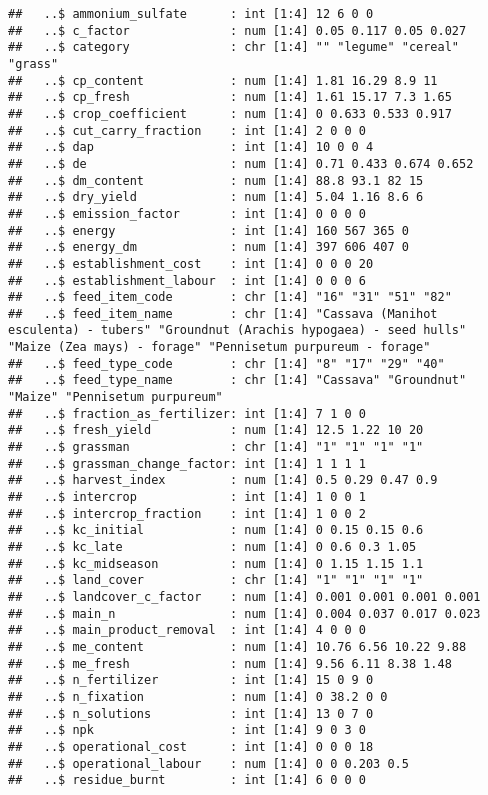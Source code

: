 \documentclass[
]{article}
\begin{document}
\begin{verbatim}
##   ..$ ammonium_sulfate      : int [1:4] 12 6 0 0
##   ..$ c_factor              : num [1:4] 0.05 0.117 0.05 0.027
##   ..$ category              : chr [1:4] "" "legume" "cereal" "grass"
##   ..$ cp_content            : num [1:4] 1.81 16.29 8.9 11
##   ..$ cp_fresh              : num [1:4] 1.61 15.17 7.3 1.65
##   ..$ crop_coefficient      : num [1:4] 0 0.633 0.533 0.917
##   ..$ cut_carry_fraction    : int [1:4] 2 0 0 0
##   ..$ dap                   : int [1:4] 10 0 0 4
##   ..$ de                    : num [1:4] 0.71 0.433 0.674 0.652
##   ..$ dm_content            : num [1:4] 88.8 93.1 82 15
##   ..$ dry_yield             : num [1:4] 5.04 1.16 8.6 6
##   ..$ emission_factor       : int [1:4] 0 0 0 0
##   ..$ energy                : int [1:4] 160 567 365 0
##   ..$ energy_dm             : num [1:4] 397 606 407 0
##   ..$ establishment_cost    : int [1:4] 0 0 0 20
##   ..$ establishment_labour  : int [1:4] 0 0 0 6
##   ..$ feed_item_code        : chr [1:4] "16" "31" "51" "82"
##   ..$ feed_item_name        : chr [1:4] "Cassava (Manihot esculenta) - tubers" "Groundnut (Arachis hypogaea) - seed hulls" "Maize (Zea mays) - forage" "Pennisetum purpureum - forage"
##   ..$ feed_type_code        : chr [1:4] "8" "17" "29" "40"
##   ..$ feed_type_name        : chr [1:4] "Cassava" "Groundnut" "Maize" "Pennisetum purpureum"
##   ..$ fraction_as_fertilizer: int [1:4] 7 1 0 0
##   ..$ fresh_yield           : num [1:4] 12.5 1.22 10 20
##   ..$ grassman              : chr [1:4] "1" "1" "1" "1"
##   ..$ grassman_change_factor: int [1:4] 1 1 1 1
##   ..$ harvest_index         : num [1:4] 0.5 0.29 0.47 0.9
##   ..$ intercrop             : int [1:4] 1 0 0 1
##   ..$ intercrop_fraction    : int [1:4] 1 0 0 2
##   ..$ kc_initial            : num [1:4] 0 0.15 0.15 0.6
##   ..$ kc_late               : num [1:4] 0 0.6 0.3 1.05
##   ..$ kc_midseason          : num [1:4] 0 1.15 1.15 1.1
##   ..$ land_cover            : chr [1:4] "1" "1" "1" "1"
##   ..$ landcover_c_factor    : num [1:4] 0.001 0.001 0.001 0.001
##   ..$ main_n                : num [1:4] 0.004 0.037 0.017 0.023
##   ..$ main_product_removal  : int [1:4] 4 0 0 0
##   ..$ me_content            : num [1:4] 10.76 6.56 10.22 9.88
##   ..$ me_fresh              : num [1:4] 9.56 6.11 8.38 1.48
##   ..$ n_fertilizer          : int [1:4] 15 0 9 0
##   ..$ n_fixation            : num [1:4] 0 38.2 0 0
##   ..$ n_solutions           : int [1:4] 13 0 7 0
##   ..$ npk                   : int [1:4] 9 0 3 0
##   ..$ operational_cost      : int [1:4] 0 0 0 18
##   ..$ operational_labour    : num [1:4] 0 0 0.203 0.5
##   ..$ residue_burnt         : int [1:4] 6 0 0 0

\end{verbatim}
\end{document}
